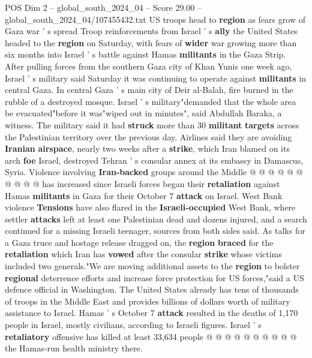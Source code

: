 \begin{textsample}{POS Dim 2 – global\_south\_2024\_04 – Score 29.00 – global\_south\_2024\_04/107455432.txt}  \label{ex:f2_pos_042}
US troops head to \textbf{region} as fears grow of Gaza war ' s spread Troop reinforcements from Israel ' s \textbf{ally} the United States headed to the \textbf{region} on Saturday, with fears of \textbf{wider} war growing more than six months into Israel ' s battle against Hamas \textbf{militants} in the Gaza Strip.
After pulling forces from the southern Gaza city of Khan Yunis one week ago, Israel ' s military said Saturday it was continuing to operate against \textbf{militants} in central Gaza.
In central Gaza ' s main city of Deir al-Balah, fire burned in the rubble of a destroyed mosque.
Israel ' s military"demanded that the whole area be evacuated"before it was"wiped out in minutes", said Abdullah Baraka, a witness.
The military said it had \textbf{struck} more than 30 \textbf{militant} \textbf{targets} across the Palestinian territory over the previous day.
Airlines said they are avoiding \textbf{Iranian} \textbf{airspace}, nearly two weeks after a \textbf{strike}, which Iran blamed on its arch \textbf{foe} Israel, destroyed Tehran ' s consular annex at its embassy in Damascus, Syria.
Violence involving \textbf{Iran-backed} groups around the Middle @ @ @ @ @ @ @ @ @ @ has increased since Israeli forces began their \textbf{retaliation} against Hamas \textbf{militants} in Gaza for their October 7 \textbf{attack} on Israel.
West Bank violence \textbf{Tensions} have also flared in the \textbf{Israeli-occupied} West Bank, where settler \textbf{attacks} left at least one Palestinian dead and dozens injured, and a search continued for a missing Israeli teenager, sources from both sides said.
As talks for a Gaza truce and hostage release dragged on, the \textbf{region} \textbf{braced} for the \textbf{retaliation} which Iran has \textbf{vowed} after the consular \textbf{strike} whose victims included two generals."We are moving additional assets to the \textbf{region} to bolster \textbf{regional} deterrence efforts and increase force protection for US forces,"said a US defence official in Washington.
The United States already has tens of thousands of troops in the Middle East and provides billions of dollars worth of military assistance to Israel.
Hamas ' s October 7 \textbf{attack} resulted in the deaths of 1,170 people in Israel, mostly civilians, according to Israeli figures.
Israel ' s \textbf{retaliatory} offensive has killed at least 33,634 people @ @ @ @ @ @ @ @ @ @ the Hamas-run health ministry there.

\end{textsample}
